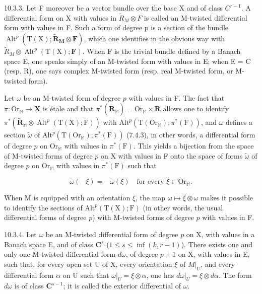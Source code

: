 10.3.3. Let F moreover be a vector bundle over the base X and of class \(C^{r-1}\). A differential form on X with values in \(\tilde{R}_{M} \otimes F\) is called an M-twisted differential form with values in F. Such a form of degree p is a section of the bundle \(\operatorname{Alt}^{p}(\mathrm{T}(\mathrm{X}); \tilde{\mathbf{R}}_{\mathbf{M}} \otimes \mathbf{F})\), which one identifies in the obvious way with \(\tilde{R}_{M} \otimes \operatorname{Alt}^{p}(\mathrm{T}(\mathrm{X}); \mathbf{F})\). When F is the trivial bundle defined by a Banach space E, one speaks simply of an M-twisted form with values in E; when E = C (resp. R), one says complex M-twisted form (resp. real M-twisted form, or M-twisted form).

Let \(\omega\) be an M-twisted form of degree \(p\) with values in F. The fact that \(\pi\colon\mathrm{Or}_{\mathbb{M}}\to\mathbf{X}\) is étale and that \(\pi^{*}(\tilde{\mathbf{R}}_{\mathbb{M}})=\mathrm{Or}_{\mathbb{M}}\times\mathbf{R}\) allows one to identify \(\pi^{*}(\tilde{\mathbf{R}}_{\mathbb{M}}\otimes\operatorname{Alt}^{p}(\mathrm{T}(\mathrm{X});\mathrm{F}))\) with \(\mathrm{Alt}^{p}(\mathrm{T}(\mathrm{Or}_{\mathbb{M}});\pi^{*}(\mathrm{F}))\), and \(\omega\) defines a section \(\tilde{\omega}\) of \(\mathrm{Alt}^{p}(\mathrm{T}(\mathrm{Or}_{\mathbb{M}});\pi^{*}(\mathrm{F}))\) (7.4.3), in other words, a differential form of degree \(p\) on \(\mathrm{Or}_{\mathbb{M}}\) with values in \(\pi^{*}(\mathrm{F})\). This yields a bijection from the space of M-twisted forms of degree \(p\) on X with values in F onto the space of forms \(\tilde{\omega}\) of degree \(p\) on \(\mathrm{Or}_{\mathbb{M}}\) with values in \(\pi^{*}(\mathrm{F})\) such that

\[
\tilde{\omega}(-\xi)=-\tilde{\omega}(\xi)\quad\text{for every }\xi\in\mathrm{Or}_{\mathbb{M}}.
\]

When M is equipped with an orientation \(\xi\), the map \(\omega \mapsto \xi \otimes \omega\) makes it possible to identify the sections of \(\mathrm{Alt}^p(\mathrm{T}(\mathrm{X});\mathrm{F})\) (in other words, the usual differential forms of degree \(p\)) with M-twisted forms of degree \(p\) with values in F.

10.3.4. Let \(\omega\) be an M-twisted differential form of degree \(p\) on X, with values in a Banach space E, and of class \(\mathbf{C}^s\) (\(1 \leqslant s \leqslant \inf(k, r - 1)\)). There exists one and only one M-twisted differential form \(d\omega\), of degree \(p + 1\) on X, with values in E, such that, for every open set U of X, every orientation \(\xi\) of \(M|_{U}\), and every differential form \(\alpha\) on U such that \(\omega|_{U} = \xi \otimes \alpha\), one has \(d\omega|_{U} = \xi \otimes d\alpha\). The form \(d\omega\) is of class \(\mathbf{C}^{s-1}\); it is called the exterior differential of \(\omega\).

